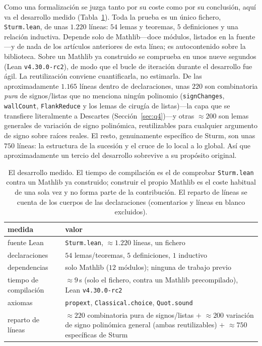 \documentclass[11pt]{article}
\newcommand{\lean}[1]{\texttt{#1}}
\begin{document}
Como una formalizaci\'on se juzga tanto por su coste como por su conclusi\'on, aqu\'i va el desarrollo
medido (Tabla~\ref{tab:cost}). Toda la prueba es un \'unico fichero, \lean{Sturm.lean}, de unas
$1{.}220$ l\'ineas: $54$ lemas y teoremas, $5$ definiciones y una relaci\'on inductiva. Depende solo
de Mathlib---doce m\'odulos, listados en la fuente---y de nada de los art\'iculos anteriores de esta
l\'inea; es autocontenido sobre la biblioteca. Sobre un Mathlib ya construido se comprueba en unos
nueve segundos (Lean \lean{v4.30.0-rc2}), de modo que el bucle de iteraci\'on durante el desarrollo
fue \'agil. La reutilizaci\'on conviene cuantificarla, no estimarla. De las aproximadamente $1{.}165$
l\'ineas dentro de declaraciones, unas $220$ son combinatoria \emph{pura} de signos/listas que no
menciona ning\'un polinomio (\lean{signChanges}, \lean{wallCount}, \lean{FlankReduce} y los lemas de
cirug\'ia de listas)---la capa que se transfiere literalmente a Descartes (Secci\'on~\ref{sec:q4})---y
otras $\approx 200$ son lemas generales de variaci\'on de signo polin\'omica, reutilizables para
cualquier argumento de signo sobre ra\'ices reales. El resto, genuinamente espec\'ifico de Sturm, son
unas $750$ l\'ineas: la estructura de la sucesi\'on y el cruce de lo local a lo global. As\'i que
aproximadamente un tercio del desarrollo sobrevive a su prop\'osito original.

\begin{table}[h]
\centering\small
{}
\begin{tabular}{@{}l p{}@{}}
\toprule
\rowcolor{ggteal!18} medida & valor \\
\midrule
fuente Lean & \lean{Sturm.lean}, $\approx 1{.}220$ l\'ineas, un fichero \\
declaraciones & $54$ lemas/teoremas, $5$ definiciones, $1$ inductivo \\
dependencias & solo Mathlib ($12$ m\'odulos); ninguna de trabajo previo \\
tiempo de compilaci\'on & $\approx 9$\,s (solo el fichero, contra un Mathlib precompilado), Lean \lean{v4.30.0-rc2} \\
axiomas & \lean{propext}, \lean{Classical.choice}, \lean{Quot.sound} \\
reparto de l\'ineas & $\approx 220$ combinatoria pura de signos/listas $+$ $\approx 200$ variaci\'on de signo polin\'omica general (ambas reutilizables) $+$ $\approx 750$ espec\'ificas de Sturm \\
\bottomrule
\end{tabular}
\caption{El desarrollo medido. El tiempo de compilaci\'on es el de comprobar \lean{Sturm.lean} contra
un Mathlib ya construido; construir el propio Mathlib es el coste habitual de una sola vez y no forma
parte de la contribuci\'on. El reparto de l\'ineas se cuenta de los cuerpos de las declaraciones
(comentarios y l\'ineas en blanco excluidos).}
\label{tab:cost}
\end{table}
\end{document}
